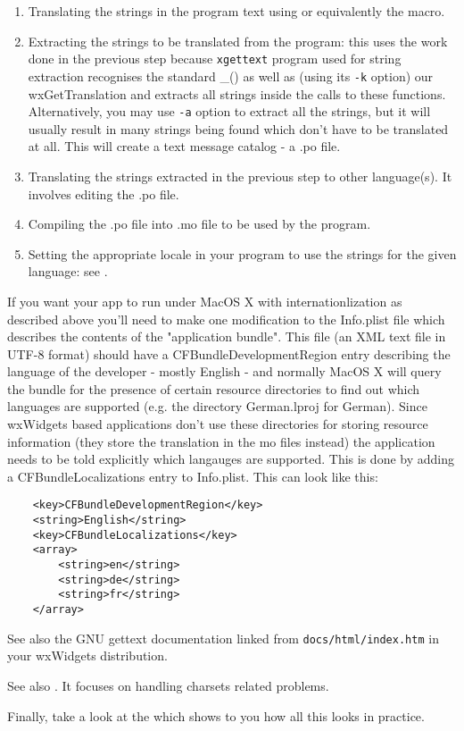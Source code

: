 \begin{enumerate}\itemsep=0pt
\item Translating the strings in the program text using 
 or equivalently the 
 macro.
\item Extracting the strings to be translated from the program: this uses the
work done in the previous step because {\tt xgettext} program used for string
extraction recognises the standard \_() as well as (using its {\tt -k} option)
our wxGetTranslation and extracts all strings inside the calls to these
functions. Alternatively, you may use {\tt -a} option to extract all the
strings, but it will usually result in many strings being found which don't
have to be translated at all. This will create a text message catalog - a .po
file.
\item Translating the strings extracted in the previous step to other
language(s). It involves editing the .po file.
\item Compiling the .po file into .mo file to be used by the program.
\item Setting the appropriate locale in your program to use the strings for the
given language: see .
\end{enumerate}

If you want your app to run under MacOS X with internationlization as
described above you'll need to make one modification to the Info.plist
file which describes the contents of the "application bundle". This
file (an XML text file in UTF-8 format) should have a
CFBundleDevelopmentRegion entry describing the language of the developer
- mostly English - and normally MacOS X will query the bundle for the
presence of certain resource directories to find out which languages
are supported (e.g. the directory German.lproj for German). 
Since wxWidgets based applications don't use these directories
for storing resource information (they store the translation in the
mo files instead) the application needs to be told explicitly which
langauges are supported. This is done by adding a CFBundleLocalizations
entry to Info.plist. This can look like this:

\begin{verbatim}
	<key>CFBundleDevelopmentRegion</key>
	<string>English</string>
	<key>CFBundleLocalizations</key>
	<array>
		<string>en</string>
		<string>de</string>
		<string>fr</string>
	</array>
\end{verbatim}

See also the GNU gettext documentation linked from {\tt docs/html/index.htm} in
your wxWidgets distribution.

See also .
It focuses on handling charsets related problems.

Finally, take a look at the  which shows
to you how all this looks in practice.

